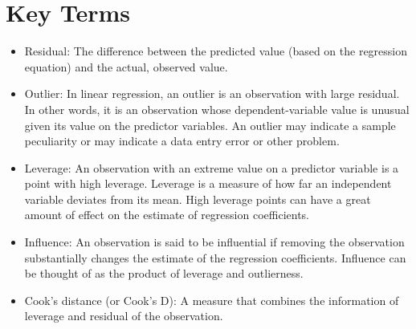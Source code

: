 \documentclass[a4paper,12pt]{article}
\begin{document}
\section{Key Terms}

\begin{itemize}
\item Residual: The difference between the predicted value (based on the regression equation) and the 
actual, observed value. 
\item Outlier: In linear regression, an outlier is an observation with large residual. In other words, it is an 
observation whose dependent-variable value is unusual given its value on the predictor variables. 
An outlier may indicate a sample peculiarity or may indicate a data entry error or other problem. 
\item Leverage: An observation with an extreme value on a predictor variable is a point with high 
leverage. Leverage is a measure of how far an independent variable deviates from its mean. High 
leverage points can have a great amount of effect on the estimate of regression coefficients. 
\item Influence: An observation is said to be influential if removing the observation substantially changes 
the estimate of the regression coefficients. Influence can be thought of as the product of leverage 
and outlierness. 
\item Cook's distance (or Cook's D): A measure that combines the information of leverage and residual of 
the observation. 
\end{itemize}


\end{document}
